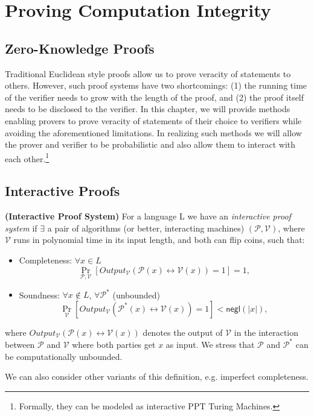 \chapter{Proving Computation Integrity}
\section{Zero-Knowledge Proofs}
Traditional Euclidean style proofs allow us to prove veracity of statements to others. However, such proof systems have two shortcomings: (1) the running time of the verifier needs to grow with the length of the proof, and (2) the proof itself needs to be disclosed to the verifier. In this chapter, we will provide methods enabling provers to prove veracity of statements of their choice to verifiers while avoiding the aforementioned limitations. In realizing such methods we will allow the prover and verifier to be probabilistic and also allow them to interact with each other.\footnote{Formally, they can be modeled as interactive PPT Turing Machines.}

\section{Interactive Proofs}
\begin{definition} {\normalfont\textbf{(Interactive Proof System)}} For a language L we have an \textit{interactive proof system} if $\exists$ a pair of algorithms (or better, interacting machines) $(\mathcal{P},\mathcal{V})$, where $\mathcal{V}$ runs in polynomial time in its input length, and both can flip coins, such that:
		\begin{itemize}
			\item Completeness: $\forall x\in L$
		$$\Pr_{\mathcal{P},\mathcal{V}} \left[Output_{\mathcal{V}}(\mathcal{P}(x) \leftrightarrow \mathcal{V}(x))=1\right]=1,$$
			\item Soundness: $\forall x\notin L$, $\forall \mathcal{P}^*$ (unbounded)
		$$\Pr_{\mathcal{V}} \left[Output_{\mathcal{V}}(\mathcal{P}^*(x) \leftrightarrow \mathcal{V}(x))=1\right]<\mathsf{negl}(|x|),$$
		\end{itemize} where $Output_{\mathcal{V}}(\mathcal{P}(x) \leftrightarrow \mathcal{V}(x))$ denotes the output of $\mathcal{V}$ in the interaction between $\mathcal{P}$ and $\mathcal{V}$ where both parties get $x$ as input.
		We stress that $\mathcal{P}$ and $\mathcal{P}^*$ can be computationally unbounded. 
  \end{definition}
We can also consider other variants of this definition, e.g. imperfect completeness.


